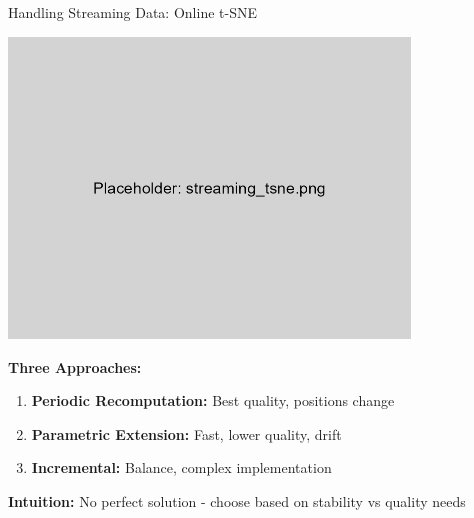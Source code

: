 \documentclass[aspectratio=169]{beamer}
\newcommand{\intuition}[1]{\colorbox{green!10}{\textcolor{intuitioncolor}{\textbf{Intuition:} #1}}}
\begin{document}
\begin{frame}{Handling Streaming Data: Online t-SNE}
\begin{center}
\includegraphics[width=0.8\textwidth]{./Figures/streaming_tsne.png}
\end{center}

\textbf{Three Approaches:}
\begin{enumerate}
\item \textbf{Periodic Recomputation:} Best quality, positions change
\item \textbf{Parametric Extension:} Fast, lower quality, drift
\item \textbf{Incremental:} Balance, complex implementation
\end{enumerate}

\intuition{No perfect solution - choose based on stability vs quality needs}
\end{frame}
\end{document}
